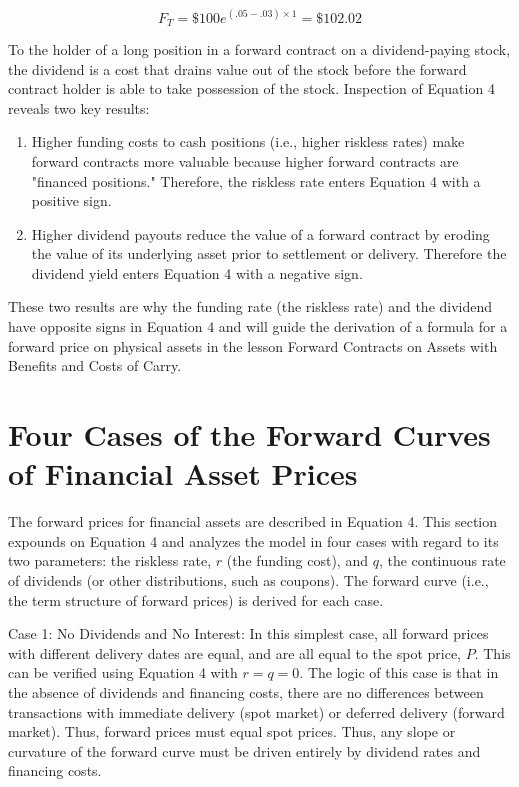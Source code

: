 \documentclass[11pt]{article}
\begin{document}
$$
F_{T}=\$ 100 e^{(.05-.03) \times 1}=\$ 102.02
$$

To the holder of a long position in a forward contract on a dividend-paying stock, the dividend is a cost that drains value out of the stock before the forward contract holder is able to take possession of the stock. Inspection of Equation 4 reveals two key results:

\begin{enumerate}
  \item Higher funding costs to cash positions (i.e., higher riskless rates) make forward contracts more valuable because higher forward contracts are "financed positions." Therefore, the riskless rate enters Equation 4 with a positive sign.

  \item Higher dividend payouts reduce the value of a forward contract by eroding the value of its underlying asset prior to settlement or delivery. Therefore the dividend yield enters Equation 4 with a negative sign.

\end{enumerate}

These two results are why the funding rate (the riskless rate) and the dividend have opposite signs in Equation 4 and will guide the derivation of a formula for a forward price on physical assets in the lesson Forward Contracts on Assets with Benefits and Costs of Carry.

\section*{Four Cases of the Forward Curves of Financial Asset Prices}
The forward prices for financial assets are described in Equation 4. This section expounds on Equation 4 and analyzes the model in four cases with regard to its two parameters: the riskless rate, $r$ (the funding cost), and $q$, the continuous rate of dividends (or other distributions, such as coupons). The forward curve (i.e., the term structure of forward prices) is derived for each case.

Case 1: No Dividends and No Interest: In this simplest case, all forward prices with different delivery dates are equal, and are all equal to the spot price, $P$. This can be verified using Equation 4 with $r=q=0$. The logic of this case is that in the absence of dividends and financing costs, there are no differences between transactions with immediate delivery (spot market) or deferred delivery (forward market). Thus, forward prices must equal spot prices. Thus, any slope or curvature of the forward curve must be driven entirely by dividend rates and financing costs.
\end{document}

